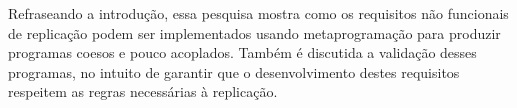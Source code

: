 Refraseando a introdução, essa pesquisa mostra como os requisitos não funcionais de replicação podem ser implementados usando metaprogramação para produzir programas coesos e pouco acoplados. Também é discutida a validação desses programas, no intuito de garantir que o desenvolvimento destes requisitos respeitem as regras necessárias à replicação.

